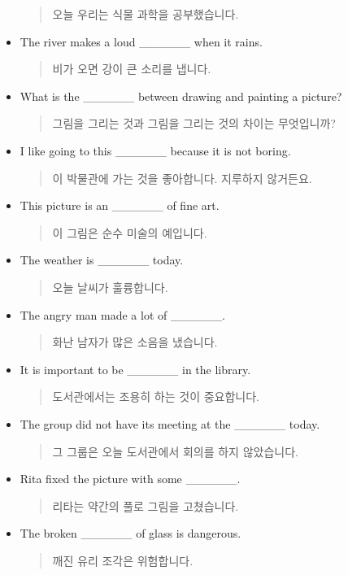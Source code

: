 \documentclass{article}
\begin{document}
\begin{addmargin}[1em]{1em}
\begin{itemize}
\begin{quote}
    오늘 우리는 식물 과학을 공부했습니다.
    \end{quote}
    \item The river makes a loud \_\_\_\_\_\_ when it rains.
    \begin{quote}
    비가 오면 강이 큰 소리를 냅니다.
    \end{quote}
    \item What is the \_\_\_\_\_\_ between drawing and painting a picture?
    \begin{quote}
    그림을 그리는 것과 그림을 그리는 것의 차이는 무엇입니까?
    \end{quote}
    \item I like going to this \_\_\_\_\_\_ because it is not boring.
    \begin{quote}
    이 박물관에 가는 것을 좋아합니다. 지루하지 않거든요.
    \end{quote}
    \item This picture is an \_\_\_\_\_\_ of fine art.
    \begin{quote}
    이 그림은 순수 미술의 예입니다.
    \end{quote}
    \item The weather is \_\_\_\_\_\_ today.
    \begin{quote}
    오늘 날씨가 훌륭합니다.
    \end{quote}
    \item The angry man made a lot of \_\_\_\_\_\_.
    \begin{quote}
    화난 남자가 많은 소음을 냈습니다.
    \end{quote}
    \item It is important to be \_\_\_\_\_\_ in the library.
    \begin{quote}
    도서관에서는 조용히 하는 것이 중요합니다.
    \end{quote}
    \item The group did not have its meeting at the \_\_\_\_\_\_ today.
    \begin{quote}
    그 그룹은 오늘 도서관에서 회의를 하지 않았습니다.
    \end{quote}
    \item Rita fixed the picture with some \_\_\_\_\_\_.
    \begin{quote}
    리타는 약간의 풀로 그림을 고쳤습니다.
    \end{quote}
    \item The broken \_\_\_\_\_\_ of glass is dangerous.
    \begin{quote}
    깨진 유리 조각은 위험합니다.

\end{quote}
\end{itemize}
\end{addmargin}
\end{document}

